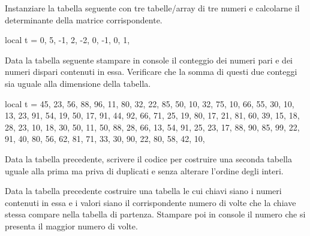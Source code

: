 \begin{Exercise}[label=cos-03]
Instanziare la tabella seguente con tre tabelle/array di tre numeri e calcolarne
il determinante della matrice corrispondente.
\begin{lines}
local t = {
    { 0,  5, -1},
    { 2, -2,  0},
    {-1,  0,  1},
}
\end{lines}
\end{Exercise}

\begin{Exercise}[label=cos-04]
Data la tabella seguente stampare in console il conteggio dei numeri pari e dei
numeri dispari contenuti in essa. Verificare che la somma di questi due
conteggi sia uguale alla dimensione della tabella.
\begin{lines}
local t = {
    45, 23, 56, 88, 96, 11,
    80, 32, 22, 85, 50, 10,
    32, 75, 10, 66, 55, 30,
    10, 13, 23, 91, 54, 19,
    50, 17, 91, 44, 92, 66,
    71, 25, 19, 80, 17, 21,
    81, 60, 39, 15, 18, 28,
    23, 10, 18, 30, 50, 11,
    50, 88, 28, 66, 13, 54,
    91, 25, 23, 17, 88, 90,
    85, 99, 22, 91, 40, 80,
    56, 62, 81, 71, 33, 30,
    90, 22, 80, 58, 42, 10,
}
\end{lines}
\end{Exercise}

\begin{Exercise}[label=cos-05]
Data la tabella precedente, scrivere il codice per costruire una seconda tabella
uguale alla prima ma priva di duplicati e senza alterare l'ordine degli interi.
\end{Exercise}

\begin{Exercise}[label=cos-06]
Data la tabella precedente costruire una tabella le cui chiavi siano i numeri
contenuti in essa e i valori siano il corrispondente numero di volte che la
chiave stessa compare nella tabella di partenza. Stampare poi in console il
numero che si presenta il maggior numero di volte.
\end{Exercise}

